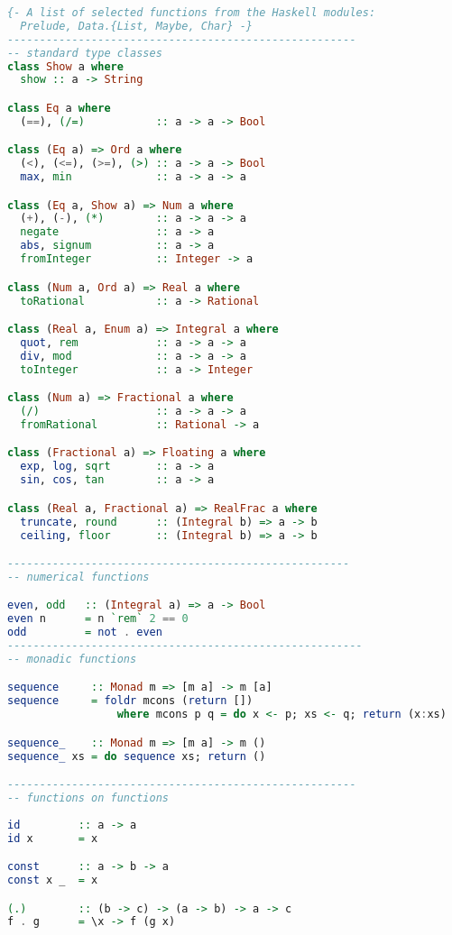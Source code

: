 \documentclass[a4paper]{article}
\begin{document}
\begin{lstlisting}[numbers=none, multicols=2,language=Haskell]
{- A list of selected functions from the Haskell modules:
  Prelude, Data.{List, Maybe, Char} -}
------------------------------------------------------
-- standard type classes
class Show a where 
  show :: a -> String

class Eq a where
  (==), (/=)           :: a -> a -> Bool

class (Eq a) => Ord a where
  (<), (<=), (>=), (>) :: a -> a -> Bool 
  max, min             :: a -> a -> a

class (Eq a, Show a) => Num a where
  (+), (-), (*)        :: a -> a -> a
  negate               :: a -> a
  abs, signum          :: a -> a
  fromInteger          :: Integer -> a

class (Num a, Ord a) => Real a where
  toRational           :: a -> Rational

class (Real a, Enum a) => Integral a where
  quot, rem            :: a -> a -> a 
  div, mod             :: a -> a -> a 
  toInteger            :: a -> Integer

class (Num a) => Fractional a where
  (/)                  :: a -> a -> a 
  fromRational         :: Rational -> a

class (Fractional a) => Floating a where 
  exp, log, sqrt       :: a -> a
  sin, cos, tan        :: a -> a

class (Real a, Fractional a) => RealFrac a where
  truncate, round      :: (Integral b) => a -> b
  ceiling, floor       :: (Integral b) => a -> b

-----------------------------------------------------
-- numerical functions

even, odd   :: (Integral a) => a -> Bool
even n      = n `rem` 2 == 0
odd         = not . even
-------------------------------------------------------
-- monadic functions

sequence     :: Monad m => [m a] -> m [a]
sequence     = foldr mcons (return [])
                 where mcons p q = do x <- p; xs <- q; return (x:xs)

sequence_    :: Monad m => [m a] -> m ()
sequence_ xs = do sequence xs; return ()

------------------------------------------------------
-- functions on functions
 
id         :: a -> a
id x       = x

const      :: a -> b -> a 
const x _  = x

(.)        :: (b -> c) -> (a -> b) -> a -> c
f . g      = \x -> f (g x)


\end{lstlisting}
\end{document}
